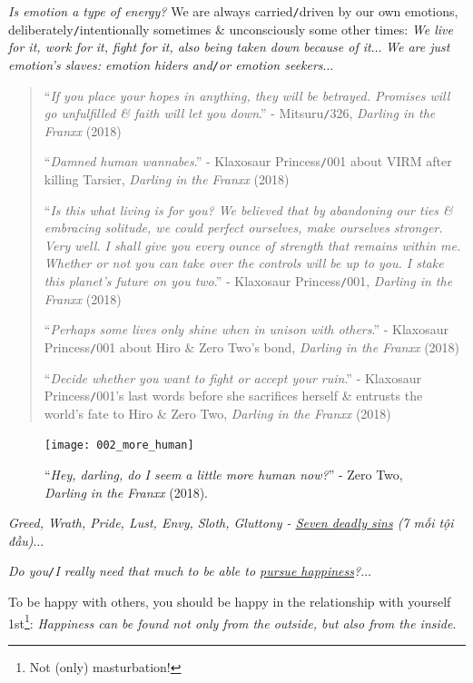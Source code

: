\documentclass[12pt]{article}
\begin{document}
{\it Is emotion a type of energy?} We are always carried{\tt/}driven by our own emotions, deliberately{\tt/}intentionally sometimes \& unconsciously some other times: {\it We live for it, work for it, fight for it, also being taken down because of it}$\ldots$ {\it We are just emotion's slaves: emotion hiders and{\tt/}or emotion seekers}$\ldots$
\begin{quotation}
	``{\it If you place your hopes in anything, they will be betrayed. Promises will go unfulfilled \& faith will let you down}.'' - Mitsuru{\tt/}326, {\it {\sc Darling} in the {\sc Franxx}} (2018)
	
	``{\it Damned human wannabes}.'' - Klaxosaur Princess{\tt/}001 about VIRM after killing Tarsier, {\it {\sc Darling} in the {\sc Franxx}} (2018)
	
	``{\it Is this what living is for you? We believed that by abandoning our ties \& embracing solitude, we could perfect ourselves, make ourselves stronger. Very well. I shall give you every ounce of strength that remains within me. Whether or not you can take over the controls will be up to you. I stake this planet's future on you two}.'' - Klaxosaur Princess{\tt/}001, {\it {\sc Darling} in the {\sc Franxx}} (2018)
	
	``{\it Perhaps some lives only shine when in unison with others}.'' - Klaxosaur Princess{\tt/}001 about Hiro \& Zero Two's bond, {\it {\sc Darling} in the {\sc Franxx}} (2018)
	
	``{\it Decide whether you want to fight or accept your ruin}.'' - Klaxosaur Princess{\tt/}001's last words before she sacrifices herself \& entrusts the world's fate to Hiro \& Zero Two, {\it {\sc Darling} in the {\sc Franxx}} (2018)
\end{quotation}

\begin{figure}[H]
	\centering
	\texttt{[image: 002\_more\_human]}
	\caption{``{\it Hey, darling, do I seem a little more human now?}'' - Zero Two, {\it {\sc Darling} in the {\sc Franxx}} (2018).}
	\label{fig5}
\end{figure}
{\it Greed, Wrath, Pride, Lust, Envy, Sloth, Gluttony - \href{https://en.wikipedia.org/wiki/Seven_deadly_sins}{Seven deadly sins} (7 mối tội đầu)}$\ldots$

{\it Do you{\tt/}I really need that much to be able to \href{https://www.imdb.com/title/tt0454921/}{pursue happiness}?}$\ldots$

To be happy with others, you should be happy in the relationship with yourself 1st\footnote{Not (only) masturbation!}: {\it Happiness can be found not only from the outside, but also from the inside}.
\end{document}
